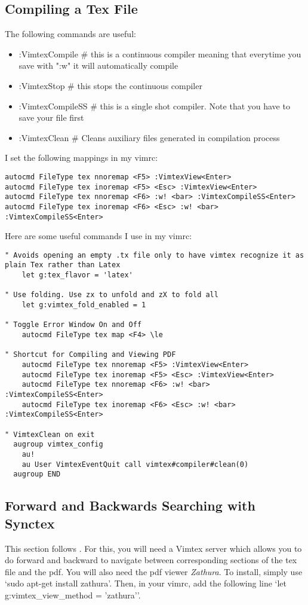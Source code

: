 \documentclass[10pt]{article}
\begin{document}
\subsection{Compiling a Tex File}
The following commands are useful:
\begin{itemize}
    \item :VimtexCompile \# this is a continuous compiler meaning that everytime
        you save with ":w" it will automatically compile
    \item :VimtexStop \# this stops the continuous compiler
    \item :VimtexCompileSS \# this is a single shot compiler. Note that you have
        to save your file first \item :VimtexClean \# Cleans auxiliary files
        generated in compilation process
\end{itemize}
I set the following mappings in my vimrc:
\begin{lstlisting}
autocmd FileType tex nnoremap <F5> :VimtexView<Enter>
autocmd FileType tex inoremap <F5> <Esc> :VimtexView<Enter>
autocmd FileType tex nnoremap <F6> :w! <bar> :VimtexCompileSS<Enter>
autocmd FileType tex inoremap <F6> <Esc> :w! <bar> :VimtexCompileSS<Enter>
\end{lstlisting}
Here are some useful commands I use in my vimrc:
\begin{lstlisting}
" Avoids opening an empty .tx file only to have vimtex recognize it as plain Tex rather than Latex
    let g:tex_flavor = 'latex'

" Use folding. Use zx to unfold and zX to fold all
    let g:vimtex_fold_enabled = 1

" Toggle Error Window On and Off
    autocmd FileType tex map <F4> \le

" Shortcut for Compiling and Viewing PDF
    autocmd FileType tex nnoremap <F5> :VimtexView<Enter>
    autocmd FileType tex inoremap <F5> <Esc> :VimtexView<Enter>
    autocmd FileType tex nnoremap <F6> :w! <bar> :VimtexCompileSS<Enter>
    autocmd FileType tex inoremap <F6> <Esc> :w! <bar> :VimtexCompileSS<Enter>

" VimtexClean on exit
  augroup vimtex_config
    au!
    au User VimtexEventQuit call vimtex#compiler#clean(0)
  augroup END
\end{lstlisting}

\subsection{Forward and Backwards Searching with Synctex}
This section follows \cite{gunther2014vimtex}. For this, you will need a Vimtex
server which allows you to do forward and backward to navigate between
corresponding sections of the tex file and the pdf. You will also need the pdf
viewer \textit{Zathura}. To install, simply use `sudo apt-get install zathura'.
Then, in your vimrc, add the following line `let g:vimtex\_view\_method =
'zathura''.\\
\end{document}
